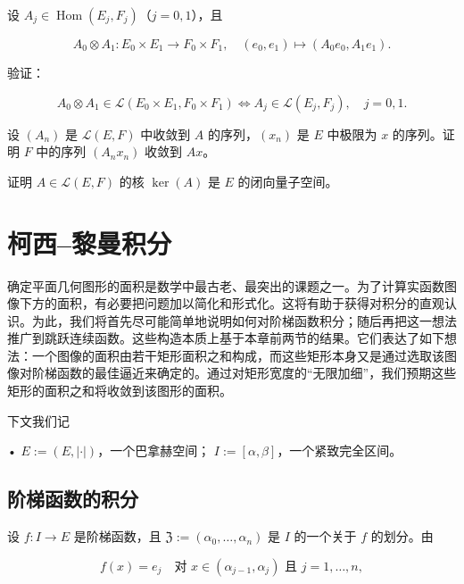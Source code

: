 \begin{exercises}
\item

设 $ A_j \in \operatorname{Hom}(E_j, F_j) $（$ j = 0, 1 $），且

\[
A_0 \otimes A_1 : E_0 \times E_1 \to F_0 \times F_1, \quad (e_0, e_1) \mapsto (A_0 e_0, A_1 e_1).
\]

验证：

\[
A_0 \otimes A_1 \in \mathcal{L}(E_0 \times E_1, F_0 \times F_1) \Longleftrightarrow A_j \in \mathcal{L}(E_j, F_j), \quad j = 0, 1.
\]
\item

设 $ (A_n) $ 是 $ \mathcal{L}(E, F) $ 中收敛到 $ A $ 的序列，$ (x_n) $ 是 $ E $ 中极限为 $ x $ 的序列。证明 $ F $ 中的序列 $ (A_n x_n) $ 收敛到 $ Ax $。

\item

证明 $ A \in \mathcal{L}(E, F) $ 的核 $ \ker(A) $ 是 $ E $ 的闭向量子空间。

\end{exercises}

\section{柯西–黎曼积分}

确定平面几何图形的面积是数学中最古老、最突出的课题之一。为了计算实函数图像下方的面积，有必要把问题加以简化和形式化。这将有助于获得对积分的直观认识。为此，我们将首先尽可能简单地说明如何对阶梯函数积分；随后再把这一想法推广到跳跃连续函数。这些构造本质上基于本章前两节的结果。它们表达了如下想法：一个图像的面积由若干矩形面积之和构成，而这些矩形本身又是通过选取该图像对阶梯函数的最佳逼近来确定的。通过对矩形宽度的“无限加细”，我们预期这些矩形的面积之和将收敛到该图形的面积。


下文我们记

• $ E := (E, \left| \cdot \right|) $，一个巴拿赫空间；
  $ I := [\alpha, \beta] $，一个紧致完全区间。

\subsection*{阶梯函数的积分}

设 $ f : I \to E $ 是阶梯函数，且 $ \mathfrak{Z} := (\alpha_0, \ldots, \alpha_n) $ 是 $ I $ 的一个关于 $ f $ 的划分。由

\[
f(x) = e_j \quad \text{对 } x \in (\alpha_{j-1}, \alpha_j) \text{ 且 } j = 1, \ldots, n ,
\]

